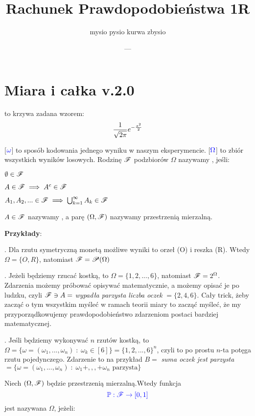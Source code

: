 \documentclass{article}
\title{Rachunek Prawdopodobieństwa 1R}
\author{mysio pysio kurwa zbysio}
\date{---}
\begin{document}
\maketit

\tableofcontents
\newpage

\section{Miara i całka v.2.0}

 to krzywa zadana wzorem:
$${1\over\sqrt{2\pi}}e^{-{x^2\over2}}$$

 [$\color{blue}\omega$] to sposób kodowania jednego wyniku w naszym eksperymencie.  [$\color{blue}\Omega$] to zbiór wszystkich wyników losowych. Rodzinę $\mathcal{F}$ podzbiorów $\Omega$ nazywamy , jeśli:

\indent \point $\emptyset\in\mathcal{F}$

\indent \point $A\in\mathcal{F}\implies A^c\in\mathcal{F}$

\indent \point $A_1, A_2,...\in \mathcal{F}\implies \bigcup_{k=1}^\infty A_k\in\mathcal{F}$
\smallskip

$A\in\mathcal{F}$ nazywamy , a parę $(\Omega,\mathcal{F})$ nazywamy przestrzenią mierzalną.
\medskip

\textbf{\large Przykłady}: 

. Dla rzutu symetryczną monetą możliwe wyniki to orzeł (O) i reszka (R). Wtedy $\Omega=\{O,R\}$, natomiast $\mathcal{F}=\mathcal{P}(\Omega)$

. Jeżeli będziemy rzucać kostką, to $\Omega=\{1,2,...,6\}$, natomiast $\mathcal{F}=2^{\Omega}$. Zdarzenia możemy próbować opisywać matematycznie, a możemy opisać je po ludzku, czyli $\mathcal{F}\ni A=$\emph{ wypadła parzysta liczba oczek} $=\{2,4,6\}$. Cały trick, żeby zacząć o tym wszystkim myśleć w ramach teorii miary to zacząć myśleć, że my przyporządkowujemy prawdopodobieństwo zdarzeniom postaci bardziej matematycznej.

. Jeśli będziemy wykonywać $n$ rzutów kostką, to $\Omega =\{\omega=(\omega_1,...,\omega_n)\;:\;\omega_k\in[6]\}=\{1,2,...,6\}^n$, czyli to po prostu $n$-ta potęga rzutu pojedynczego. Zdarzenie to na przykład $B=$\emph{ suma oczek jest parzysta }$=\{\omega=(\omega_1,...,\omega_n)\;:\;\omega_1+,,,+\omega_n\text{ parzysta}\}$
\medskip

\medskip

Niech $(\Omega,\mathcal{F})$ będzie przestrzenią mierzalną.Wtedy funkcja
$$\color{blue}\mathbb{P}:\mathcal{F}\to[0,1]$$
jest nazywana  $\Omega$, jeżeli:
\end{document}
